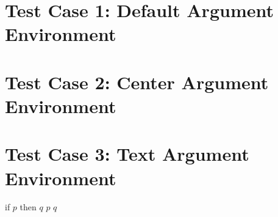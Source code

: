 \documentclass[12pt]{article}
\begin{document}
\section{Test Case 1: Default Argument Environment}
\begin{argument}
\end{argument}

\section{Test Case 2: Center Argument Environment}
\begin{center}
    \begin{argument}
    \end{argument}
\end{center}

\section{Test Case 3: Text Argument Environment}
\begin{textargument}
    \textpremise if $p$ then $q$
    \textpremise $p$
    \textconclusion $q$
\end{textargument}
    
\end{document}

